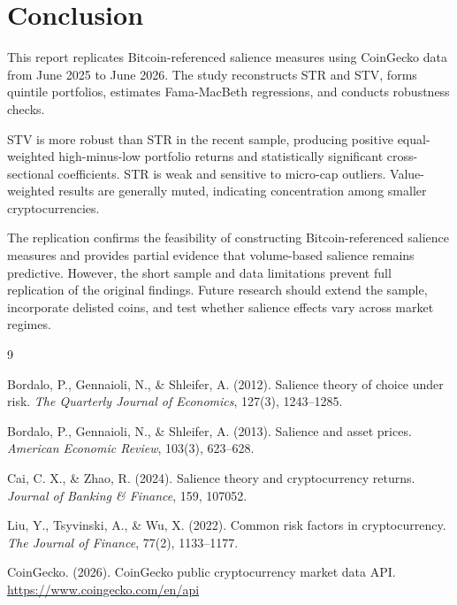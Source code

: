 \documentclass[11pt]{article}
\begin{document}
\section{Conclusion}

This report replicates Bitcoin-referenced salience measures using CoinGecko data from June 2025 to June 2026. The study reconstructs STR and STV, forms quintile portfolios, estimates Fama-MacBeth regressions, and conducts robustness checks.

STV is more robust than STR in the recent sample, producing positive equal-weighted high-minus-low portfolio returns and statistically significant cross-sectional coefficients. STR is weak and sensitive to micro-cap outliers. Value-weighted results are generally muted, indicating concentration among smaller cryptocurrencies.

The replication confirms the feasibility of constructing Bitcoin-referenced salience measures and provides partial evidence that volume-based salience remains predictive. However, the short sample and data limitations prevent full replication of the original findings. Future research should extend the sample, incorporate delisted coins, and test whether salience effects vary across market regimes.

\begin{thebibliography}{9}

Bordalo, P., Gennaioli, N., \& Shleifer, A. (2012).
Salience theory of choice under risk.
\textit{The Quarterly Journal of Economics}, 127(3), 1243--1285.

Bordalo, P., Gennaioli, N., \& Shleifer, A. (2013).
Salience and asset prices.
\textit{American Economic Review}, 103(3), 623--628.

Cai, C. X., \& Zhao, R. (2024).
Salience theory and cryptocurrency returns.
\textit{Journal of Banking \& Finance}, 159, 107052.

Liu, Y., Tsyvinski, A., \& Wu, X. (2022).
Common risk factors in cryptocurrency.
\textit{The Journal of Finance}, 77(2), 1133--1177.

CoinGecko. (2026).
CoinGecko public cryptocurrency market data API.
\url{https://www.coingecko.com/en/api}

\end{thebibliography}
\end{document}
